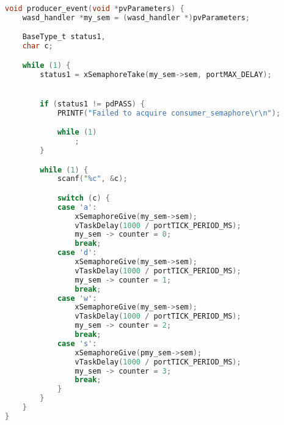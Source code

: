 \begin{lstlisting}[language=c,caption=Problem 4.2 Producer Task, label=list:p4_2_prod]
void producer_event(void *pvParameters) {
    wasd_handler *my_sem = (wasd_handler *)pvParameters;

    BaseType_t status1,
    char c;

    while (1) {
        status1 = xSemaphoreTake(my_sem->sem, portMAX_DELAY);


        if (status1 != pdPASS) {
            PRINTF("Failed to acquire consumer_semaphore\r\n");

            while (1)
                ;
        }

        while (1) {
            scanf("%c", &c);

            switch (c) {
            case 'a':
                xSemaphoreGive(my_sem->sem);
                vTaskDelay(1000 / portTICK_PERIOD_MS);
                my_sem -> counter = 0;
                break;
            case 'd':
                xSemaphoreGive(my_sem->sem);
                vTaskDelay(1000 / portTICK_PERIOD_MS);
                my_sem -> counter = 1;
                break;
            case 'w':
                xSemaphoreGive(my_sem->sem);
                vTaskDelay(1000 / portTICK_PERIOD_MS);
                my_sem -> counter = 2;
                break;
            case 's':
                xSemaphoreGive(pmy_sem->sem);
                vTaskDelay(1000 / portTICK_PERIOD_MS);
                my_sem -> counter = 3;
                break;
            }
        }
    }
}
\end{lstlisting}
